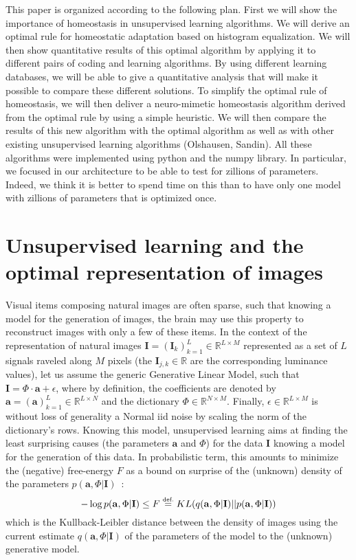 \documentclass[a4paper, 11pt, draft]{article} %
\newcommand{\eqdef}{\ensuremath{\stackrel{\mbox{\upshape\tiny def.}}{=}}}
\newcommand{\RR}{\mathbb{R}}
\newcommand{\coef}{\mathbf{a}} %
\newcommand{\image}{\mathbf{I}} %
\newcommand{\dico}{\Phi} %
\begin{document}
This paper is organized according to the following plan. First we will show the importance of homeostasis in unsupervised learning algorithms. We will derive an optimal rule for homeostatic adaptation based on histogram equalization. We will then show quantitative results of this optimal algorithm by applying it to different pairs of coding and learning algorithms. By using different learning databases, we will be able to give a quantitative analysis that will make it possible to compare these different solutions. To simplify the optimal rule of homeostasis, we will then deliver a neuro-mimetic homeostasis algorithm derived from the optimal rule by using a simple heuristic. We will then compare the results of this new algorithm with the optimal algorithm as well as with other existing unsupervised learning algorithms (Olshausen, Sandin). 
All these algorithms were implemented using python and the numpy library. In particular, we focused in our architecture to be able to test for zillions of parameters. Indeed, we think it is better to spend time on this than to have only one model with zillions of parameters that is optimized once.
\section{Unsupervised learning and the optimal representation of images}%
Visual items composing natural images are often sparse, such that knowing a model for the generation of images, the brain may use this property to reconstruct images with only a few of these items. 
In the context of the representation of natural images $\image = (\image_k)_{k=1}^L \in \RR^{L \times M}$ represented as a set of $L$ signals raveled along $M$ pixels (the $\image_{j, k} \in \RR$ are the corresponding luminance values), let us assume the generic Generative Linear Model, such that $\image = \dico \cdot \coef + \epsilon $, where by definition, the coefficients are denoted by $\coef = (\coef)_{k=1}^L \in \RR^{L \times N}$ and the dictionary $\dico \in \RR^{N \times M}$. Finally, $\epsilon  \in \RR^{L \times M}$ is without loss of generality a Normal iid noise by scaling the norm of the dictionary's rows. 
Knowing this model, unsupervised learning aims at finding the least surprising causes (the parameters $\coef$ and $\dico$) for the data  $\image$ knowing a model for the generation of this data. In probabilistic term, this amounts to minimize the (negative) free-energy $F$ as a bound on surprise of the (unknown) density of the parameters $p( \coef, \dico | \image)$~\citep{Doersch2016}:
\begin{equation} -\log p( \coef, \dico | \image) \leq F \eqdef  KL( q(\coef, \dico  | \image ) ||  p( \coef, \dico | \image) ) \end{equation}
which is the Kullback-Leibler distance between the density of images using the current estimate $q(\coef, \dico  | \image )$ of the parameters of the model to the (unknown) generative model. 
\end{document}
